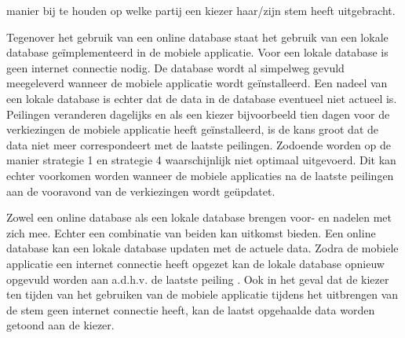 manier bij te houden op welke partij een kiezer haar/zijn stem heeft uitgebracht.

Tegenover het gebruik van een online database staat het gebruik van een lokale database ge\"{i}mplementeerd in de mobiele applicatie. Voor een lokale database is geen internet connectie nodig. De database wordt al simpelweg gevuld meegeleverd wanneer de mobiele applicatie wordt ge\"{i}nstalleerd. Een nadeel van een lokale database is echter dat de data in de database eventueel niet actueel is. Peilingen veranderen dagelijks en als een kiezer bijvoorbeeld tien dagen voor de verkiezingen de mobiele applicatie heeft ge\"{i}nstalleerd, is de kans groot dat de data niet meer correspondeert met de laatste peilingen. Zodoende worden op de manier strategie 1 en strategie 4 waarschijnlijk niet optimaal uitgevoerd. Dit kan echter voorkomen worden wanneer de mobiele applicaties na de laatste peilingen aan de vooravond van de verkiezingen wordt ge\"{u}pdatet. 

Zowel een online database als een lokale database brengen voor- en nadelen met zich mee. Echter een combinatie van beiden kan uitkomst bieden. Een online database kan een lokale database updaten met de actuele data. Zodra de mobiele applicatie een internet connectie heeft opgezet kan de lokale database opnieuw opgevuld worden aan a.d.h.v. de laatste peiling \citep{silberschatz1997database}. Ook in het geval dat de kiezer ten tijden van het gebruiken van de mobiele applicatie tijdens het uitbrengen van de stem geen internet connectie heeft, kan de laatst opgehaalde data worden getoond aan de kiezer. 






